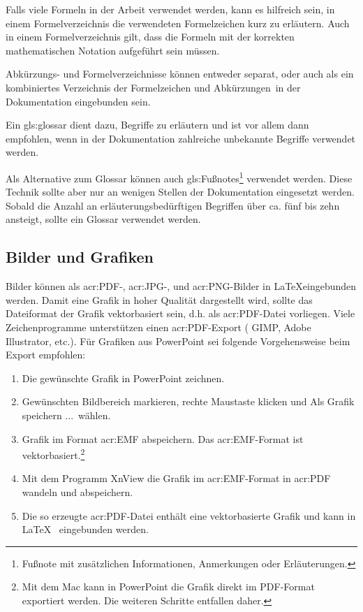 Falls viele Formeln in der Arbeit verwendet werden, kann es hilfreich sein, in einem Formelverzeichnis die verwendeten Formelzeichen kurz zu erläutern. Auch in einem Formelverzeichnis gilt, dass die Formeln mit der korrekten mathematischen Notation aufgeführt sein müssen.

Abkürzungs- und Formelverzeichnisse können entweder separat, oder auch als ein kombiniertes \glqq Verzeichnis der Formelzeichen und Abkürzungen\grqq~in der Dokumentation eingebunden sein.

Ein \gls{gls:glossar} dient dazu, Begriffe zu erläutern und ist vor allem dann empfohlen, wenn in der Dokumentation zahlreiche unbekannte Begriffe verwendet werden. 

Als Alternative zum Glossar können auch \glspl{gls:Fußnote}\footnote{Fußnote mit zusätzlichen Informationen, Anmerkungen oder Erläuterungen.} verwendet werden. Diese Technik sollte aber nur an wenigen Stellen der Dokumentation eingesetzt werden. Sobald die Anzahl an erläuterungsbedürftigen Begriffen über ca. fünf bis zehn ansteigt, sollte ein Glossar verwendet werden.

\subsection{Bilder und Grafiken}

Bilder können als \acrshort{acr:PDF}-, \acrshort{acr:JPG}-, und \acrshort{acr:PNG}-Bilder in \LaTeX eingebunden werden. Damit eine Grafik in hoher Qualität dargestellt wird, sollte das Dateiformat der Grafik vektorbasiert sein, d.h. als \acrshort{acr:PDF}-Datei vorliegen. Viele Zeichenprogramme unterstützen einen \acrshort{acr:PDF}-Export ( GIMP, Adobe Illustrator, etc.). Für Grafiken aus PowerPoint sei folgende Vorgehensweise beim Export empfohlen:

\begin{enumerate}
	\item Die gewünschte Grafik in PowerPoint zeichnen.
	\item Gewünschten Bildbereich markieren, rechte Maustaste klicken und \glqq Als Grafik speichern ...\grqq~wählen.
	\item Grafik im Format \acrshort{acr:EMF} abspeichern. Das \acrshort{acr:EMF}-Format ist vektorbasiert.\footnote{Mit dem Mac kann in PowerPoint die Grafik direkt im PDF-Format exportiert werden. Die weiteren Schritte entfallen daher.}
	\item Mit dem Programm XnView die Grafik im \acrshort{acr:EMF}-Format in \acrshort{acr:PDF} wandeln und abspeichern.
	\item Die so erzeugte \acrshort{acr:PDF}-Datei enthält eine vektorbasierte Grafik und kann in \LaTeX~ eingebunden werden.
\end{enumerate}

